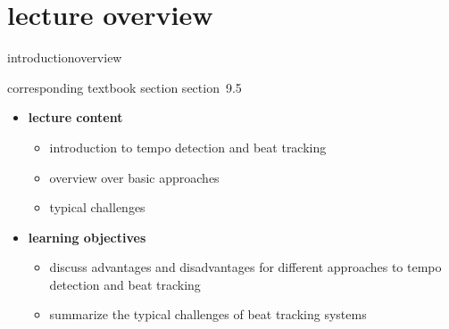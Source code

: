 


\subtitle{Module 9.5: Tempo Detection}


	

    \section[overview]{lecture overview}
        \begin{frame}{introduction}{overview}
            \begin{block}{corresponding textbook section}
                    section~9.5
            \end{block}

            \begin{itemize}
                \item   \textbf{lecture content}
                    \begin{itemize}
                        \item   introduction to tempo detection and beat tracking
                        \item   overview over basic approaches
                        \item    typical challenges
                    \end{itemize}
                \bigskip
                \item<2->   \textbf{learning objectives}
                    \begin{itemize}
                        \item   discuss advantages and disadvantages for different approaches to tempo detection and beat tracking
                        \item   summarize the typical challenges of beat tracking systems
                    \end{itemize}
            \end{itemize}
        \end{frame}


